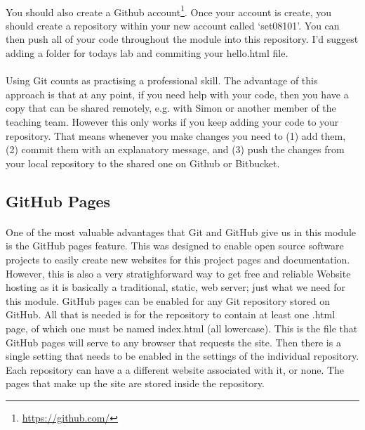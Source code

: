 \documentclass[10pt, a4paper]{article}
\begin{document}
\paragraph{} You should also create a Github account\footnote{\url{https://github.com/}}. Once your account is create, you should create a repository within your new account called `set08101'. You can then push all of your code throughout the module into this repository. I'd suggest adding a folder for todays lab and commiting your hello.html file. 

\paragraph{} Using Git counts as practising a professional skill. The advantage of this approach is that at any point, if you need help with your code, then you have a copy that can be shared remotely, e.g. with Simon or another member of the teaching team. However this only works if you keep adding your code to your repository. That means whenever you make changes you need to (1) add them, (2) commit them with an explanatory message,  and (3) push the changes from your local repository to the shared one on Github or Bitbucket.


\subsection{GitHub Pages}
\paragraph{} One of the most valuable advantages that Git and GitHub give us in this module is the GitHub pages feature. This was designed to enable open source software projects to easily create new websites for this project pages and documentation. However, this is also a very stratighforward way to get free and reliable Website hosting as it is basically a traditional, static, web server; just what we need for this module. GitHub pages can be enabled for any Git repository stored on GitHub. All that is needed is for the repository to contain at least one .html page, of which one must be named index.html (all lowercase). This is the file that GitHub pages will serve to any browser that requests the site. Then there is a single setting that needs to be enabled in the settings of the individual repository. Each repository can have a a different website associated with it, or none. The pages that make up the site are stored inside the repository.
\end{document}
